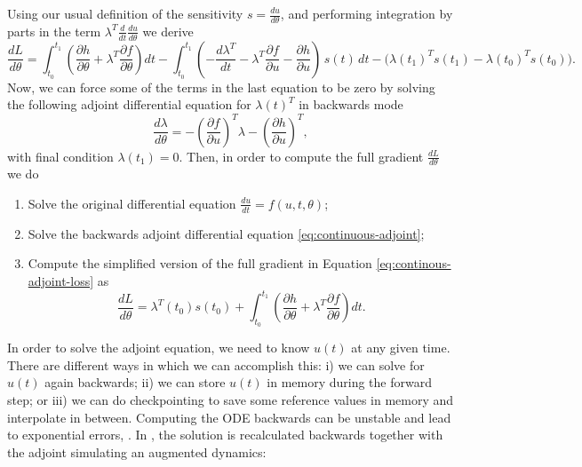 Using our usual definition of the sensitivity $s = \frac{du}{d\theta}$, and performing integration by parts in the term $\lambda^T \frac{d}{dt} \frac{du}{d\theta}$ we derive 
\begin{equation}
    \frac{dL}{d\theta}
    = 
    \int_{t_0}^{t_1} \left( \frac{\partial h}{\partial \theta} + \lambda^T \frac{\partial f}{\partial \theta} \right) dt
    - 
    \int_{t_0}^{t_1} \left( - \frac{d\lambda^T}{dt} - \lambda^T \frac{\partial f}{\partial u} - \frac{\partial h}{\partial u} \right) \, s(t) \, dt
    -
    \bigg ( \lambda(t_1)^T s(t_1) - \lambda(t_0)^T s(t_0) \bigg ).
    \label{eq:continous-adjoint-loss}
\end{equation}
Now, we can force some of the terms in the last equation to be zero by solving the following adjoint differential equation for $\lambda(t)^T$ in backwards mode
\begin{equation}
    \frac{d\lambda}{d\theta} = - \left(\frac{\partial f}{\partial u}\right)^T \lambda - \left( \frac{\partial h}{\partial u} \right)^T,
    \label{eq:continuous-adjoint}
\end{equation}
with final condition $\lambda(t_1) = 0$. Then, in order to compute the full gradient $\frac{dL}{d\theta}$ we do
\begin{enumerate}
    \item Solve the original differential equation $\frac{du}{dt} = f(u, t, \theta)$;
    \item Solve the backwards adjoint differential equation \eqref{eq:continuous-adjoint};
    \item Compute the simplified version of the full gradient in Equation \eqref{eq:continous-adjoint-loss} as
    \begin{equation}
        \frac{dL}{d\theta} = \lambda^T (t_0) s(t_0) + \int_{t_0}^{t_1}  \left( \frac{\partial h}{\partial \theta} + \lambda^T \frac{\partial f}{\partial \theta} \right)  dt.
    \end{equation}
\end{enumerate}
In order to solve the adjoint equation, we need to know $u(t)$ at any given time. There are different ways in which we can accomplish this: i) we can solve for $u(t)$ again backwards; ii) we can store $u(t)$ in memory during the forward step; or iii) we can do checkpointing to save some reference values in memory and interpolate in between. 
Computing the ODE backwards can be unstable and lead to exponential errors, \cite{kim_stiff_2021}. 
In \cite{chen_neural_2019}, the solution is recalculated backwards together with the adjoint simulating an augmented dynamics: 
